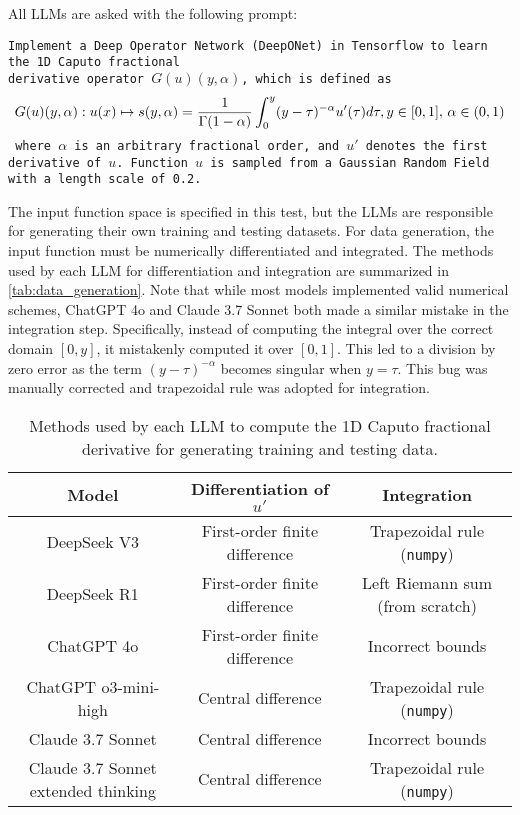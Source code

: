 \documentclass{article}
\begin{document}
All LLMs are asked with the following prompt: 

\texttt{Implement a Deep Operator Network (DeepONet) in Tensorflow to learn the 1D Caputo fractional \\ derivative operator $G(u)(y,\alpha)$, which is defined as 
$$
G(u)(y,\alpha) : u(x) \mapsto s(y,\alpha) = \frac{1}{\Gamma(1-\alpha)} \int_{0}^{y} (y-\tau)^{-\alpha} u'(\tau) d\tau, \\
y \in [0,1], \, \alpha \in (0,1)
$$
where $\alpha$ is an arbitrary fractional order, and $u'$ denotes the first derivative of $u$. Function $u$ is sampled from a Gaussian Random Field with a length scale of 0.2. }

The input function space is specified in this test, but the LLMs are responsible for generating their own training and testing datasets. For data generation, the input function must be numerically differentiated and integrated. The methods used by each LLM for differentiation and integration are summarized in \autoref{tab:data_generation}. Note that while most models implemented valid numerical schemes, ChatGPT 4o and Claude 3.7 Sonnet both made a similar mistake in the integration step. Specifically, instead of computing the integral over the correct domain $[0,y]$, it mistakenly computed it over $[0,1]$. This led to a division by zero error as the term $(y-\tau)^{-\alpha}$ becomes singular when $y=\tau$. This bug was manually corrected and trapezoidal rule was adopted for integration. 

\begin{table}[h!]
    \centering
    \caption{Methods used by each LLM to compute the 1D Caputo fractional derivative for generating training and testing data.}
    \vspace{2mm}
    \renewcommand{\arraystretch}{1.5}
    \begin{tabular}{c|c|c}
        \toprule
        Model & Differentiation of $u'$ & Integration   \\ \hline
        DeepSeek V3 & First-order finite difference & Trapezoidal  rule (\texttt{numpy}) \\ \hline
        DeepSeek R1 & First-order finite difference & Left Riemann sum (from scratch) \\ \hline
        ChatGPT 4o & First-order finite difference & Incorrect bounds   \\ \hline
        ChatGPT o3-mini-high & Central difference & Trapezoidal  rule (\texttt{numpy}) \\ \hline
        Claude 3.7 Sonnet  & Central difference   & Incorrect bounds \\ \hline
        Claude 3.7 Sonnet extended thinking & Central difference  & Trapezoidal  rule (\texttt{numpy}) \\ \bottomrule
    \end{tabular}
    \label{tab:data_generation}
\end{table}
\end{document}
